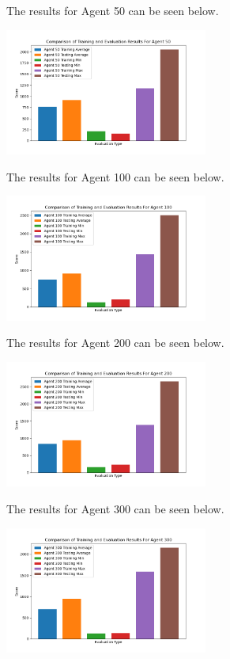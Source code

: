 \documentclass[
	a4paper, %
	10pt, %
	unnumberedsections, %
	twoside, %
]{LTJournalArticle}
\begin{document}
The results for Agent 50 can be seen below.

\begin{center}
	\includegraphics[width=0.5\textwidth]{Figures/Comparison/Agent 50.png}
\end{center}

The results for Agent 100 can be seen below.

\begin{center}
	\includegraphics[width=0.5\textwidth]{Figures/Comparison/Agent 100.png}
\end{center}

The results for Agent 200 can be seen below.

\begin{center}
	\includegraphics[width=0.5\textwidth]{Figures/Comparison/Agent 200.png}
\end{center}

The results for Agent 300 can be seen below.

\begin{center}
	\includegraphics[width=0.5\textwidth]{Figures/Comparison/Agent 300.png}
\end{center}
\end{document}
